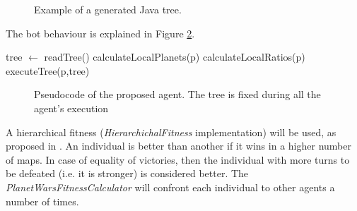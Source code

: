 {\begin{figure} 
\usebox{\javaboxrts}
\caption{Example of a generated Java tree.}
\label{fig:java}
\end{figure}

The bot behaviour is explained in Figure \ref{alg:turn}.

\newsavebox{\algoartsbox}
\begin{lrbox}{\algoartsbox}
\begin{minipage}{10cm}
\begin{algorithmic}
\STATE tree $\gets$ readTree()
    \STATE calculateLocalPlanets(p)%
    \STATE calculateLocalRatios(p)%
    \STATE executeTree(p,tree)%
  \ENDFOR

\ENDWHILE
\end{algorithmic}
\end{minipage}
\end{lrbox}

\begin{figure}
\usebox{\algoartsbox}
\caption{Pseudocode of the proposed agent. The tree is fixed during all the agent's execution}
\label{alg:turn}
\end{figure}






	

A hierarchical fitness ({\em HierarchichalFitness} implementation) will be used, as proposed in \cite{Mora2012Genebot}. An individual is better than another if it wins in a higher number of maps. In case of equality of victories, then the individual with more turns to be defeated (i.e. it is stronger) is considered better. The {\em PlanetWarsFitnessCalculator} will confront each individual to other agents a number of times.

}
